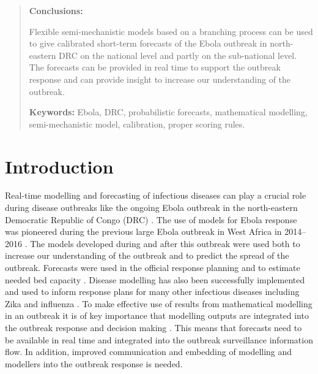 \documentclass[12pt]{article}
\begin{document}
\begin{abstract}
  \medskip
  
  {\bf Conclusions:}

  Flexible semi-mechanistic models based on a branching process can be used to give calibrated short-term forecasts of the Ebola outbreak in north-eastern DRC on the national level and partly on the sub-national level. The forecasts can be provided in real time to support the outbreak response and can provide  insight to increase our understanding of the outbreak.

  \medskip

  {\bf Keywords:} Ebola, DRC, probabilistic forecasts, mathematical modelling, semi-mechanistic model, calibration, proper scoring rules.

\end{abstract}

\newpage

\tableofcontents

\newpage

\section{Introduction}


Real-time modelling and forecasting of infectious diseases can play a crucial role during disease outbreaks like the ongoing Ebola outbreak in the north-eastern Democratic Republic of Congo (DRC) \cite{heesterbeekModelingInfectiousDisease2015,riversUsingOutbreakScience2019a}. The use of models for Ebola response was pioneered during the previous large Ebola outbreak in West Africa in 2014--2016 \cite{chretienMathematicalModelingWest}. The models developed during and after this outbreak were used both to increase our understanding of the outbreak and to predict the spread of the outbreak. Forecasts were used in the official response planning \cite{whoebolaresponseteamEbolaVirusDisease2014} and to estimate needed bed capacity \cite{camachoTemporalChangesEbola2015}. Disease modelling has also been successfully implemented and used to inform response plans for many other infectious diseases including Zika \cite{kobresSystematicReviewEvaluation2019} and influenza \cite{chretienInfluenzaForecastingHuman2014}. To make effective use of results from mathematical modelling in an outbreak it is of key importance that modelling outputs are integrated into the outbreak response and decision making \cite{riversUsingOutbreakScience2019a}. This means that forecasts need to be available in real time and integrated into the outbreak surveillance information flow. In addition, improved communication and embedding of modelling and modellers into the outbreak response is needed. 
\end{document}
